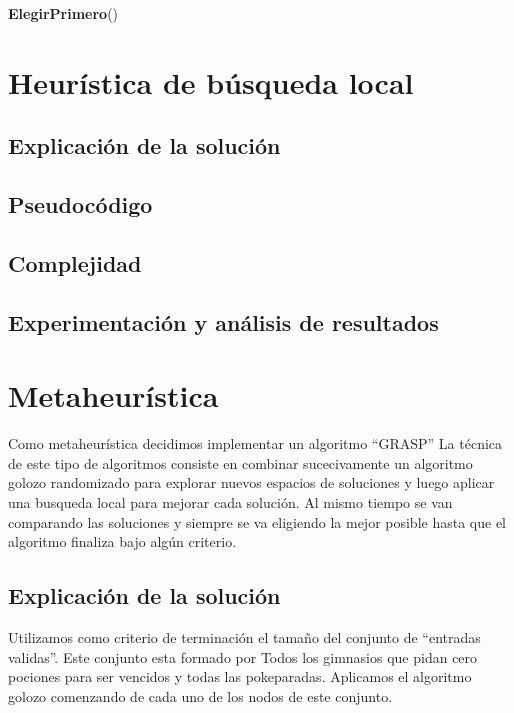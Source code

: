 \documentclass[spanish,12pt]{article}
\begin{document}
\begin{algorithm}[H]{\textbf{ElegirPrimero}()}


\section{Heurística de búsqueda local}

\subsection{Explicación de la solución}

\subsection{Pseudocódigo}

\subsection{Complejidad}

\subsection{Experimentación y análisis de resultados}



\section{Metaheurística}

Como metaheurística decidimos implementar un algoritmo ``GRASP''
La técnica de este tipo de algoritmos consiste en combinar sucecivamente un algoritmo golozo randomizado para explorar nuevos espacios de soluciones y luego aplicar una busqueda local para mejorar cada solución. Al mismo tiempo se van comparando las soluciones y siempre se va eligiendo la mejor posible hasta que el algoritmo finaliza bajo algún criterio.

\subsection{Explicación de la solución}

Utilizamos como criterio de terminación el tamaño del conjunto de ``entradas validas''. Este conjunto esta formado por Todos los gimnasios que pidan cero pociones para ser vencidos y todas las pokeparadas. Aplicamos el algoritmo golozo comenzando de cada uno de los nodos de este conjunto. 


\end{algorithm}
\end{document}
